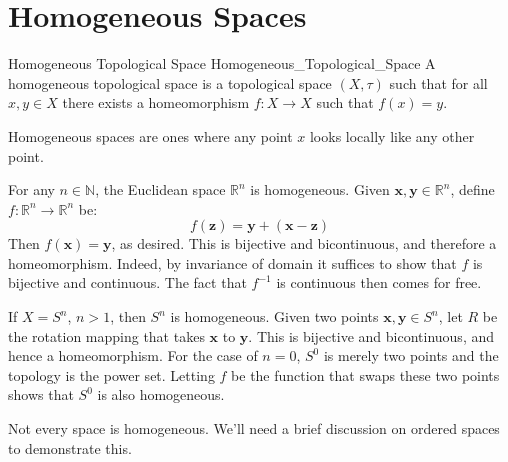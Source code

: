 \documentclass[oneside]{book}                                                  %
\begin{document}
        \section{Homogeneous Spaces}
            \begin{fdefinition}{Homogeneous Topological Space}
                               {Homogeneous_Topological_Space}
                A homogeneous topological space is a topological space
                $(X,\tau)$ such that for all $x,y\in{X}$ there exists a
                homeomorphism $f:X\rightarrow{X}$ such that $f(x)=y$.
            \end{fdefinition}
            Homogeneous spaces are ones where any point $x$ looks locally like
            any other point.
            \begin{example}
                For any $n\in\mathbb{N}$, the Euclidean space $\mathbb{R}^{n}$
                is homogeneous. Given $\mathbf{x},\mathbf{y}\in\mathbb{R}^{n}$,
                define $f:\mathbb{R}^{n}\rightarrow\mathbb{R}^{n}$ be:
                \begin{equation}
                    f(\mathbf{z})=\mathbf{y}+(\mathbf{x}-\mathbf{z})
                \end{equation}
                Then $f(\mathbf{x})=\mathbf{y}$, as desired. This is bijective
                and bicontinuous, and therefore a homeomorphism. Indeed, by
                invariance of domain it suffices to show that $f$ is bijective
                and continuous. The fact that $f^{\minus{1}}$ is continuous then
                comes for free.
            \end{example}
            \begin{example}
                If $X=S^{n}$, $n>1$, then $S^{n}$ is homogeneous. Given two
                points $\mathbf{x},\mathbf{y}\in{S}^{n}$, let $R$ be the
                rotation mapping that takes $\mathbf{x}$ to $\mathbf{y}$. This
                is bijective and bicontinuous, and hence a homeomorphism. For
                the case of $n=0$, $S^{0}$ is merely two points and the topology
                is the power set. Letting $f$ be the function that swaps these
                two points shows that $S^{0}$ is also homogeneous.
            \end{example}
            Not every space is homogeneous. We'll need a brief discussion on
            ordered spaces to demonstrate this.
\end{document}
